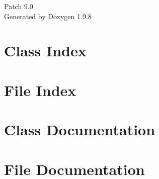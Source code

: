 \documentclass[twoside]{book}
\newcommand{\+}{\discretionary{\mbox{\scriptsize$\hookleftarrow$}}{}{}}
\newcommand{\clearemptydoublepage}{%
    \newpage{\pagestyle{empty}\cleardoublepage}%
  }
\begin{document}
  \raggedbottom
    \hypersetup{pageanchor=false,
                bookmarksnumbered=true,
                pdfencoding=unicode
               }
  \begin{titlepage}
  \vspace*{7cm}
  \begin{center}%
  {\Large Patch 9.\+0}\\
  \vspace*{1cm}
  {\large Generated by Doxygen 1.9.8}\\
  \end{center}
  \end{titlepage}
  \clearemptydoublepage
  \tableofcontents
  \clearemptydoublepage
  \hypersetup{pageanchor=true}

\chapter{Class Index}

\chapter{File Index}

\chapter{Class Documentation}


\chapter{File Documentation}

  \backmatter
  \newpage
  \clearemptydoublepage
  \printindex
\end{document}

